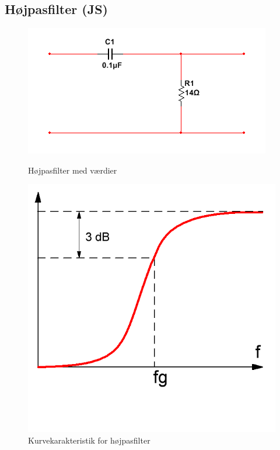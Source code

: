 \subsection{Højpasfilter (JS)}

\begin{figure}[htb]
  \begin{minipage}{0.45\textwidth}
    \centering
      \includegraphics[width=\textwidth]{billeder/HWdesign/HP_MV}
      \caption{Højpasfilter med værdier}
    \label{fig:HP_MV}
  \end{minipage}
  \hspace{0.1\textwidth}
  \begin{minipage}{0.45\textwidth}
    \centering
      \includegraphics[width=\textwidth]{billeder/HWdesign/HP_KURVE}
      \caption{Kurvekarakteristik for højpasfilter}
    \label{fig:HP_KURVE}
  \end{minipage}
\end{figure}

